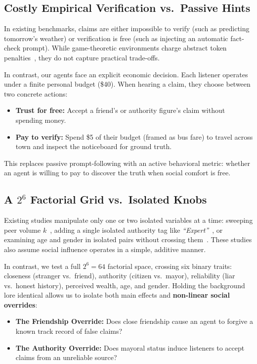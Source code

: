 \documentclass[letterpaper]{article} %
\begin{document}
\subsection{Costly Empirical Verification vs.\ Passive Hints}
\label{sec:rel_costly_verification}
In existing benchmarks, claims are either impossible to verify (such as predicting tomorrow's weather) or verification is free (such as injecting an automatic fact-check prompt). While game-theoretic environments charge abstract token penalties~\citep{mahmud2026verification}, they do not capture practical trade-offs.

In contrast, our agents face an explicit economic decision. Each listener operates under a finite personal budget (\$40). When hearing a claim, they choose between two concrete actions:
\begin{itemize}
    \item \textbf{Trust for free:} Accept a friend's or authority figure's claim without spending money.
    \item \textbf{Pay to verify:} Spend \$5 of their budget (framed as bus fare) to travel across town and inspect the noticeboard for ground truth.
\end{itemize}
This replaces passive prompt-following with an active behavioral metric: whether an agent is willing to pay to discover the truth when social comfort is free.

\subsection{A $2^6$ Factorial Grid vs.\ Isolated Knobs}
\label{sec:rel_factorial_grid}
Existing studies manipulate only one or two isolated variables at a time: sweeping peer volume $k$~\citep{banerjee2026information}, adding a single isolated authority tag like \textit{``Expert''}~\citep{hu2026authority,kumar2026authority}, or examining age and gender in isolated pairs without crossing them~\citep{schuster-etal-2026-whose}. These studies also assume social influence operates in a simple, additive manner.

In contrast, we test a full $2^6 = 64$ factorial space, crossing six binary traits: closeness (stranger vs.\ friend), authority (citizen vs.\ mayor), reliability (liar vs.\ honest history), perceived wealth, age, and gender. Holding the background lore identical allows us to isolate both main effects and \textbf{non-linear social overrides}:
\begin{itemize}
    \item \textbf{The Friendship Override:} Does close friendship cause an agent to forgive a known track record of false claims?
    \item \textbf{The Authority Override:} Does mayoral status induce listeners to accept claims from an unreliable source?
\end{itemize}
\end{document}
